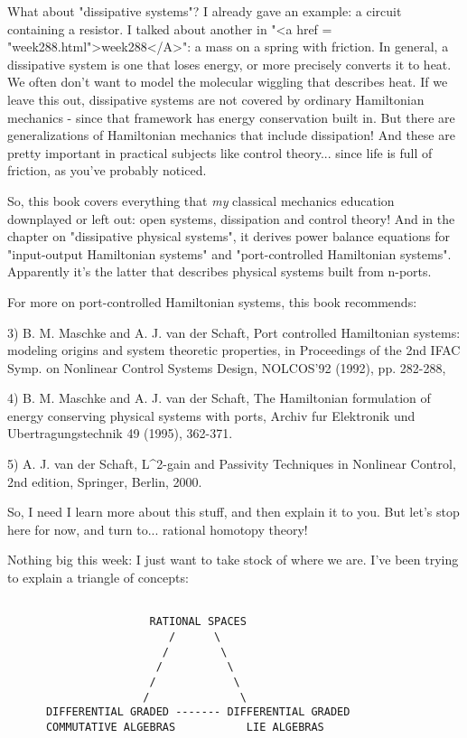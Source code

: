 What about "dissipative systems"?  I already gave an
example: a circuit containing a resistor.  I talked about another in
"<a href = "week288.html">week288</A>": a mass on a spring
with friction.  In general, a dissipative system is one that loses
energy, or more precisely converts it to heat.  We often don't want to
model the molecular wiggling that describes heat.  If we leave this
out, dissipative systems are not covered by ordinary Hamiltonian
mechanics - since that framework has energy conservation built in.
But there are generalizations of Hamiltonian mechanics that include
dissipation!  And these are pretty important in practical subjects
like control theory... since life is full of friction, as you've
probably noticed.

So, this book covers everything that \emph{my} classical mechanics
education downplayed or left out: open systems, dissipation and
control theory!  And in the chapter on "dissipative physical
systems", it derives power balance equations for
"input-output Hamiltonian systems" and "port-controlled
Hamiltonian systems".  Apparently it's the latter that describes
physical systems built from n-ports.  

For more on port-controlled Hamiltonian systems, this book recommends:

3) B. M. Maschke and A. J. van der Schaft, Port controlled Hamiltonian
systems: modeling origins and system theoretic properties, in
Proceedings of the 2nd IFAC Symp. on Nonlinear Control Systems Design,
NOLCOS'92 (1992), pp. 282-288,

4) B. M. Maschke and A. J. van der Schaft, The Hamiltonian formulation
of energy conserving physical systems with ports, Archiv fur
Elektronik und Ubertragungstechnik 49 (1995), 362-371.

5) A. J. van der Schaft, L^{2}-gain and Passivity Techniques in
Nonlinear Control, 2nd edition, Springer, Berlin, 2000.

So, I need I learn more about this stuff, and then explain it to you.
But let's stop here for now, and turn to... rational homotopy theory!

Nothing big this week: I just want to take stock of where we are.
I've been trying to explain a triangle of concepts:


\begin{verbatim}

                      RATIONAL SPACES
                         /      \  
                        /        \  
                       /          \  
                      /            \
                     /              \
      DIFFERENTIAL GRADED ------- DIFFERENTIAL GRADED
      COMMUTATIVE ALGEBRAS           LIE ALGEBRAS
\end{verbatim}
    

